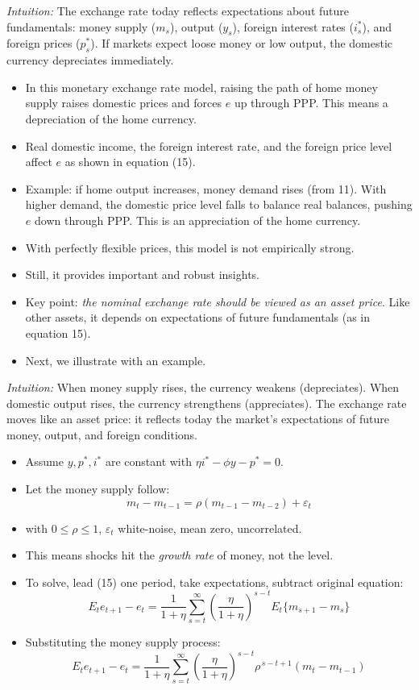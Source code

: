 \documentclass[12pt]{article}
\begin{document}
\textit{Intuition:}  
The exchange rate today reflects expectations about future fundamentals: money supply ($m_s$), output ($y_s$), foreign interest rates ($i_s^*$), and foreign prices ($p_s^*$). If markets expect loose money or low output, the domestic currency depreciates immediately.

\begin{itemize}
    \item In this monetary exchange rate model, raising the path of home money supply raises domestic prices and forces $e$ up through PPP. This means a depreciation of the home currency.  
    \item Real domestic income, the foreign interest rate, and the foreign price level affect $e$ as shown in equation (15).  
    \item Example: if home output increases, money demand rises (from 11). With higher demand, the domestic price level falls to balance real balances, pushing $e$ down through PPP. This is an appreciation of the home currency.  
    \item With perfectly flexible prices, this model is not empirically strong.  
    \item Still, it provides important and robust insights.  
    \item Key point: \textit{the nominal exchange rate should be viewed as an asset price}. Like other assets, it depends on expectations of future fundamentals (as in equation 15).  
    \item Next, we illustrate with an example.  
\end{itemize}

\textit{Intuition:}  
When money supply rises, the currency weakens (depreciates). When domestic output rises, the currency strengthens (appreciates). The exchange rate moves like an asset price: it reflects today the market’s expectations of future money, output, and foreign conditions.

\begin{itemize}
    \item Assume $y, p^*, i^*$ are constant with $\eta i^* - \phi y - p^* = 0$.  
    \item Let the money supply follow:  
    \[
        m_t - m_{t-1} = \rho(m_{t-1} - m_{t-2}) + \varepsilon_t
    \]  
    \item with $0 \leq \rho \leq 1$, $\varepsilon_t$ white-noise, mean zero, uncorrelated.  
    \item This means shocks hit the \textit{growth rate} of money, not the level.  
    \item To solve, lead (15) one period, take expectations, subtract original equation:  
    \[
        E_t e_{t+1} - e_t = \frac{1}{1+\eta} \sum_{s=t}^\infty \left(\frac{\eta}{1+\eta}\right)^{s-t} E_t\{m_{s+1} - m_s\}
    \]  
    \item Substituting the money supply process:  
    \[
        E_t e_{t+1} - e_t = \frac{1}{1+\eta} \sum_{s=t}^\infty \left(\frac{\eta}{1+\eta}\right)^{s-t} \rho^{\,s-t+1}(m_t - m_{t-1})
    \]  
\end{itemize}
\end{document}
